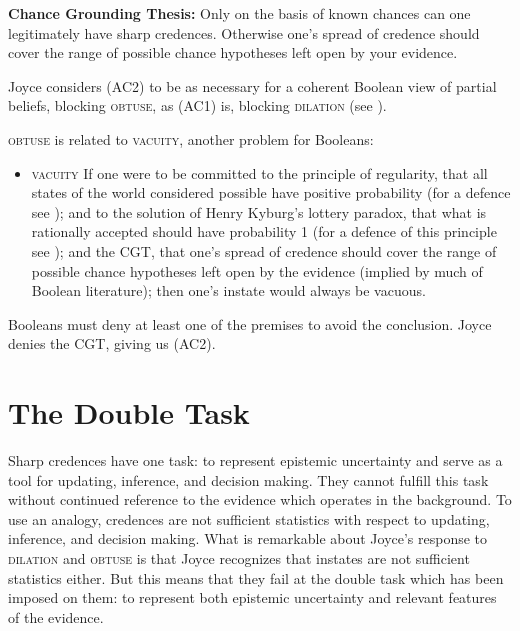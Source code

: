 \documentclass[11pt]{article}
\begin{document}
\begin{quotex}
  \textbf{Chance Grounding Thesis:} Only on the basis of known chances
  can one legitimately have sharp credences. Otherwise one's spread of
  credence should cover the range of possible chance hypotheses left
  open by your evidence. 
\end{quotex}

Joyce considers (AC2) to be as necessary for a coherent Boolean view
of partial beliefs, blocking \textsc{obtuse}, as (AC1) is, blocking
\textsc{dilation} (see ). 

\textsc{obtuse} is related to \textsc{vacuity}, another problem for
Booleans:

\begin{itemize}
\item \textsc{vacuity} If one were to be committed to the principle of
  regularity, that all states of the world considered possible have
  positive probability (for a defence see );
  and to the solution of Henry Kyburg's lottery paradox, that what is
  rationally accepted should have probability 1 (for a defence of this
  principle see ); and the CGT, that
  one's spread of credence should cover the range of possible chance
  hypotheses left open by the evidence (implied by much of Boolean
  literature); then one's instate would always be vacuous.
\end{itemize}

Booleans must deny at least one of the premises to avoid the
conclusion. Joyce denies the CGT, giving us (AC2). 

\section{The Double Task}
\label{TheDoubleTask}

Sharp credences have one task: to represent epistemic uncertainty and
serve as a tool for updating, inference, and decision making. They
cannot fulfill this task without continued reference to the evidence
which operates in the background. To use an analogy, credences are not
sufficient statistics with respect to updating, inference, and
decision making. What is remarkable about Joyce's response to
\textsc{dilation} and \textsc{obtuse} is that Joyce recognizes that
instates are not sufficient statistics either. But this means that
they fail at the double task which has been imposed on them: to
represent both epistemic uncertainty and relevant features of the evidence.
\end{document}
